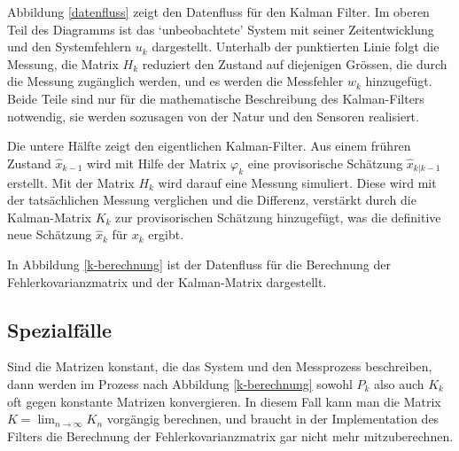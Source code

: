 Abbildung \ref{datenfluss} zeigt den Datenfluss für den Kalman Filter.
Im oberen Teil des Diagramms ist das `unbeobachtete' System mit seiner
Zeitentwicklung und den Systemfehlern $u_k$ dargestellt.
Unterhalb der
punktierten Linie folgt die Messung, die Matrix $H_k$ reduziert den Zustand
auf diejenigen Grössen, die durch die Messung zugänglich werden, und es
werden die Messfehler $w_k$ hinzugefügt.
Beide Teile sind nur für die
mathematische Beschreibung des Kalman-Filters notwendig, sie werden
sozusagen von der Natur und den Sensoren realisiert.

Die untere Hälfte zeigt den eigentlichen Kalman-Filter.
Aus einem frühren Zustand $\hat x_{k-1}$ wird mit Hilfe der Matrix
$\varphi_k$ eine provisorische Schätzung $\hat x_{k|k-1}$ erstellt.
Mit der Matrix $H_k$ wird darauf eine Messung simuliert.
Diese wird
mit der tatsächlichen Messung verglichen und die Differenz, verstärkt durch
die Kalman-Matrix $K_k$ zur provisorischen Schätzung hinzugefügt, was
die definitive neue Schätzung $\hat x_k$ für $x_k$ ergibt.

In Abbildung \ref{k-berechnung} ist der Datenfluss für die Berechnung
der Fehlerkovarianzmatrix und der Kalman-Matrix dargestellt.

\subsection{Spezialfälle}
Sind die Matrizen konstant, die das System und den Messprozess beschreiben, 
dann werden im Prozess nach Abbildung \ref{k-berechnung} sowohl $P_k$ also auch
$K_k$ oft gegen konstante Matrizen konvergieren.
In diesem Fall kann man
die Matrix $K=\lim_{n\to\infty}K_n$ vorgängig berechnen, und braucht
in der Implementation des Filters die Berechnung der Fehlerkovarianzmatrix
gar nicht mehr mitzuberechnen. 

